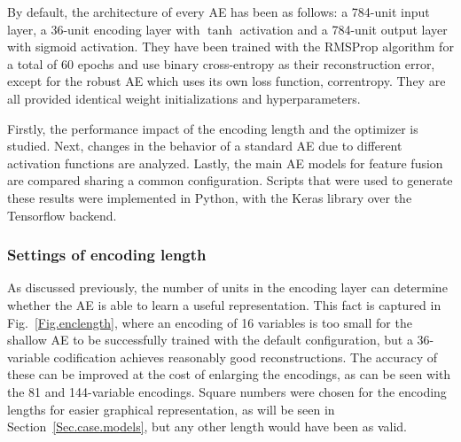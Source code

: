 \documentclass[preprint,5p,compress]{elsarticle}
\begin{document}
By default, the architecture of every AE has been as follows: a 784-unit input layer, a 36-unit encoding layer with $\tanh$ activation and a 784-unit output layer with sigmoid activation. They have been trained with the RMSProp algorithm for a total of 60 epochs and use binary cross-entropy as their reconstruction error, except for the robust AE which uses its own loss function, correntropy. They are all provided identical weight initializations  and hyperparameters.

Firstly, the performance impact of the encoding length and the optimizer  is studied. Next, changes in the behavior of a standard AE due to different activation functions are analyzed. Lastly, the main AE models for feature fusion are compared sharing a common configuration. Scripts that were used to generate these results were implemented in Python, with the Keras library over the Tensorflow backend.

\subsubsection{Settings of encoding length}
As discussed previously, the number of units in the encoding layer can determine whether the AE is able to learn a useful representation. This fact is captured in Fig.~\ref{Fig.enclength}, where an encoding of 16 variables is too small for the shallow AE to be successfully trained with the default configuration, but a 36-variable codification achieves reasonably good reconstructions. The accuracy of these can be improved at the cost of enlarging the encodings, as can be seen with the 81 and 144-variable encodings. Square numbers were chosen for the encoding lengths for easier graphical representation, as will be seen in Section~\ref{Sec.case.models}, but any other length would have been as valid.
\end{document}
